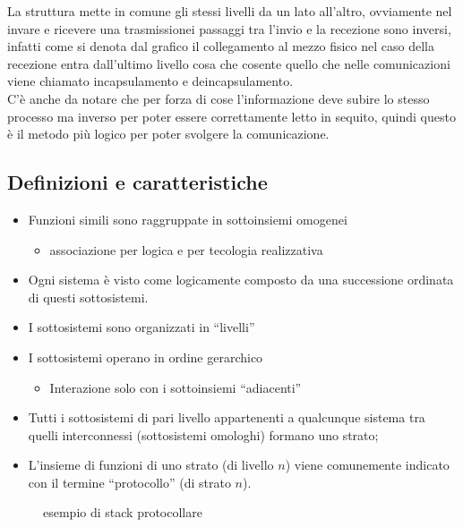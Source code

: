 \begin{nota}
  La struttura mette in comune gli stessi livelli da un lato all'altro, ovviamente nel invare e ricevere
  una trasmissionei passaggi tra l'invio e la recezione sono inversi, infatti come si denota dal grafico
  il collegamento al mezzo fisico nel caso della recezione entra dall'ultimo livello cosa che cosente quello
  che nelle comunicazioni viene chiamato incapsulamento e deincapsulamento. \\C'è anche da notare che per
  forza di cose l'informazione deve subire lo stesso processo ma inverso per poter essere correttamente letto
  in sequito, quindi questo è il metodo più logico per poter svolgere la comunicazione.
\end{nota}
\subsection{Definizioni e caratteristiche}
\label{sec:defecardiunostack}
\begin{itemize}
\item Funzioni simili sono raggruppate in sottoinsiemi omogenei
  \begin{itemize}
  \item associazione per logica e per tecologia realizzativa
  \end{itemize}
\item Ogni sistema è visto come logicamente composto da una successione ordinata di questi sottosistemi.
\item I sottosistemi sono organizzati in ``livelli''
\item I sottosistemi operano in ordine gerarchico
  \begin{itemize}
  \item Interazione solo con i sottoinsiemi ``adiacenti''
  \end{itemize}
\item Tutti i sottosistemi di pari livello appartenenti a qualcunque sistema tra quelli interconnessi
  (sottosistemi omologhi) formano uno strato;
\item L'insieme di funzioni di uno strato (di livello $n$) viene comunemente indicato con il termine
  ``protocollo'' (di strato $n$).
\end{itemize}
\begin{figure}[ht!]
  \centering
  \resizebox{14cm}{!} {}
  \caption{esempio di stack protocollare}
  \label{fig:esstackprot}
\end{figure}

